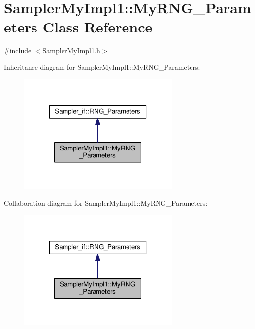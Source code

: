 \hypertarget{class_sampler_my_impl1_1_1_my_r_n_g___parameters}{\section{Sampler\-My\-Impl1\-:\-:My\-R\-N\-G\-\_\-\-Parameters Class Reference}
\label{class_sampler_my_impl1_1_1_my_r_n_g___parameters}
}


{\ttfamily \#include $<$Sampler\-My\-Impl1.\-h$>$}



Inheritance diagram for Sampler\-My\-Impl1\-:\-:My\-R\-N\-G\-\_\-\-Parameters\-:
\nopagebreak
\begin{figure}[H]
\begin{center}
\leavevmode
\includegraphics[width=226pt]{class_sampler_my_impl1_1_1_my_r_n_g___parameters__inherit__graph}
\end{center}
\end{figure}


Collaboration diagram for Sampler\-My\-Impl1\-:\-:My\-R\-N\-G\-\_\-\-Parameters\-:
\nopagebreak
\begin{figure}[H]
\begin{center}
\leavevmode
\includegraphics[width=226pt]{class_sampler_my_impl1_1_1_my_r_n_g___parameters__coll__graph}
\end{center}
\end{figure}
